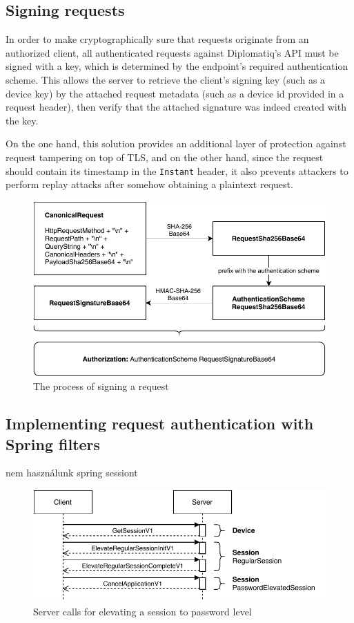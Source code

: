 \subsection{Signing requests}

In order to make cryptographically sure that requests originate from an authorized client, all authenticated requests against Diplomatiq's API must be signed with a key, which is determined by the endpoint's required authentication scheme. This allows the server to retrieve the client's signing key (such as a device key) by the attached request metadata (such as a device id provided in a request header), then verify that the attached signature was indeed created with the key.

On the one hand, this solution provides an additional layer of protection against request tampering on top of TLS, and on the other hand, since the request should contain its timestamp in the \lstinline{Instant} header, it also prevents attackers to perform replay attacks after somehow obtaining a plaintext request.

\begin{figure}[!htb]
    \includegraphics[width=\textwidth]{figures/request-signature.pdf}
    \caption{The process of signing a request}
    \label{fig:request-signature}
\end{figure}

\subsection{Implementing request authentication with Spring filters}

nem használunk spring sessiont

\begin{figure}[!htb]
    \includegraphics[width=\textwidth]{figures/elevate-to-password-session.pdf}
    \caption{Server calls for elevating a session to password level}
    \label{fig:elevate-to-password-session}
\end{figure}

